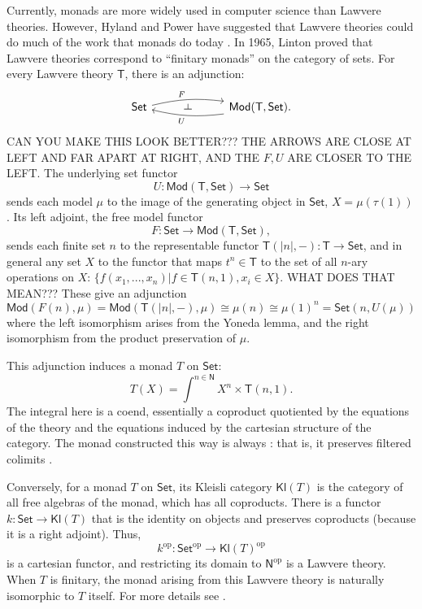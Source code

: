 \documentclass{amsart}
\newcommand{\define}[1]{{\bf \boldmath{#1}}}
\theoremstyle{definition}
\def\ld{\rotatebox[origin=c]{-90}{$\dashv$}} %
\newcommand{\Set}{\mathsf{Set}}
\newcommand{\Mod}{\mathsf{Mod}}
\newcommand{\NN}{\mathsf{N}}
\newcommand{\T}{\mathsf{T}}
\newcommand{\Kl}{\mathsf{Kl}}
\newcommand{\op}{\mathrm{op}}
\newcommand{\maps}{\colon}
\begin{document}
Currently, monads are more widely used in computer science than Lawvere theories.  However, Hyland and Power have suggested that Lawvere theories could do much of the work that monads do today \cite{hylandpower}. In 1965, Linton \cite{linton} proved that Lawvere theories correspond to ``finitary monads'' on the category of sets.   For every Lawvere theory $\T$, there is an adjunction:
\[\begin{tikzcd}
	\Set \arrow[bend left=10,below]{rr}{F}
	& \ld &
	\arrow[bend left=10,above]{ll}{U} \Mod(\T,\Set).
\end{tikzcd}\]
CAN YOU MAKE THIS LOOK BETTER???  THE ARROWS ARE CLOSE AT LEFT AND FAR APART AT RIGHT, AND THE $F, U$ ARE CLOSER TO THE LEFT.
The underlying set functor 
\[  U\maps \Mod(\T,\Set) \to \Set \]
sends each model $\mu$ to the image of the generating object in $\Set$, $X = \mu(\tau(1))$. 
Its left adjoint, the free model functor 
\[       F\maps\Set \to \Mod(\T,\Set), \]
sends each finite set $n$ to the representable functor $\T(|n|,-)\maps\T \to \Set$, and in general any set $X$ to the functor that maps $t^n \in \T$ to the set of all $n$-ary operations on $X$: $\{f(x_1,...,x_n)|f\in \T(n,1), x_i\in X\}$. WHAT DOES THAT MEAN??? These give an adjunction
\[   \Mod(F(n),\mu) = \Mod(\T(|n|,-),\mu) \cong \mu(n) \cong \mu(1)^n = \Set(n,U(\mu))\] 
where the left isomorphism arises from the Yoneda lemma, and the right isomorphism from the product preservation of $\mu$. 

This adjunction induces a monad $T$ on $\Set$:
\begin{equation}
T(X) = \int^{n\in \NN} X^n \times \T(n,1).
\end{equation}
The integral here is a coend, essentially a coproduct quotiented by the equations of the theory and the equations induced by the cartesian structure of the category.    The monad constructed this way is always \define{finitary}: that is, it preserves filtered colimits \cite{adamekrosicky}.

Conversely, for a monad $T$ on $\Set$, its Kleisli category $\Kl(T)$ is the category of all free algebras of the monad, which has all coproducts. There is a functor $k\maps \Set \to \Kl(T)$ that is the identity on objects and preserves coproducts (because it is a right adjoint).  Thus,
\[ k^{\op}\maps \Set^{\op} \to \Kl(T)^{\op} \]
is a cartesian functor, and restricting its domain to $\NN^{\op}$ is a Lawvere theory. 
When $T$ is finitary, the monad arising from this Lawvere theory is naturally isomorphic to $T$ itself.  For more details see \cite{barrwells,lawvere,milewski}.
\end{document}
